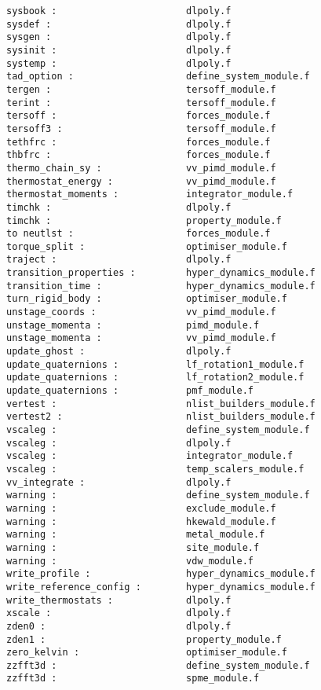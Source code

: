 \begin{verbatim}
sysbook :                       dlpoly.f
sysdef :                        dlpoly.f
sysgen :                        dlpoly.f
sysinit :                       dlpoly.f
systemp :                       dlpoly.f
tad_option :                    define_system_module.f
tergen :                        tersoff_module.f
terint :                        tersoff_module.f
tersoff :                       forces_module.f
tersoff3 :                      tersoff_module.f
tethfrc :                       forces_module.f
thbfrc :                        forces_module.f
thermo_chain_sy :               vv_pimd_module.f
thermostat_energy :             vv_pimd_module.f
thermostat_moments :            integrator_module.f
timchk :                        dlpoly.f
timchk :                        property_module.f
to neutlst :                    forces_module.f
torque_split :                  optimiser_module.f
traject :                       dlpoly.f
transition_properties :         hyper_dynamics_module.f
transition_time :               hyper_dynamics_module.f
turn_rigid_body :               optimiser_module.f
unstage_coords :                vv_pimd_module.f
unstage_momenta :               pimd_module.f
unstage_momenta :               vv_pimd_module.f
update_ghost :                  dlpoly.f
update_quaternions :            lf_rotation1_module.f
update_quaternions :            lf_rotation2_module.f
update_quaternions :            pmf_module.f
vertest :                       nlist_builders_module.f
vertest2 :                      nlist_builders_module.f
vscaleg :                       define_system_module.f
vscaleg :                       dlpoly.f
vscaleg :                       integrator_module.f
vscaleg :                       temp_scalers_module.f
vv_integrate :                  dlpoly.f
warning :                       define_system_module.f
warning :                       exclude_module.f
warning :                       hkewald_module.f
warning :                       metal_module.f
warning :                       site_module.f
warning :                       vdw_module.f
write_profile :                 hyper_dynamics_module.f
write_reference_config :        hyper_dynamics_module.f
write_thermostats :             dlpoly.f
xscale :                        dlpoly.f
zden0 :                         dlpoly.f
zden1 :                         property_module.f
zero_kelvin :                   optimiser_module.f
zzfft3d :                       define_system_module.f
zzfft3d :                       spme_module.f
\end{verbatim}
